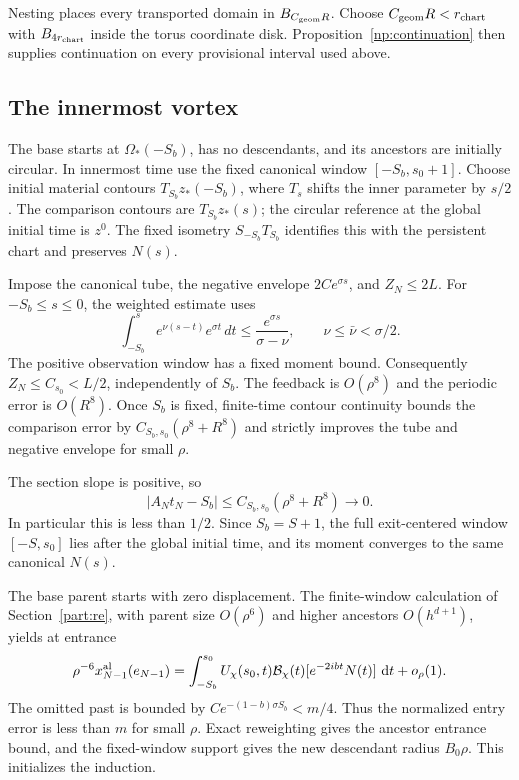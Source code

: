 \documentclass[11pt]{amsart}
\theoremstyle{remark}
\numberwithin{equation}{section}
\newcommand{\dd}{\,\mathrm d}
\begin{document}
Nesting places every transported domain in $B_{C_{\rm geom}R}$.
Choose $C_{\rm geom}R<r_{\rm chart}$ with $B_{4r_{\rm chart}}$
inside the torus coordinate disk. Proposition~\ref{np:continuation}
then supplies continuation on every provisional interval used above.


\subsection{The innermost vortex}
The base starts at $\Omega_*(-S_b)$, has no descendants, and its
ancestors are initially circular. In innermost time use the fixed
canonical window $[-S_b,s_0+1]$. Choose initial material contours
$T_{S_b}z_*(-S_b)$, where $T_s$ shifts the inner parameter by $s/2$.
The comparison contours are $T_{S_b}z_*(s)$; the circular reference
at the global initial time is $z^0$. The fixed isometry
$S_{-S_b}T_{S_b}$ identifies this with the persistent chart and
preserves $N(s)$.

Impose the canonical tube, the negative envelope $2Ce^{\sigma s}$,
and $Z_N\le2L$. For $-S_b\le s\le0$, the weighted estimate uses
\[
 \int_{-S_b}^s e^{\nu(s-t)}e^{\sigma t}\,dt
       \le\frac{e^{\sigma s}}{\sigma-\nu},\qquad
 \nu\le\bar\nu<\sigma/2.
\]
The positive observation window has a fixed moment bound.
Consequently $Z_N\le C_{s_0}<L/2$, independently of $S_b$.
The feedback is $O(\rho^8)$ and the periodic error is $O(R^8)$.
Once $S_b$ is fixed, finite-time contour continuity bounds the
comparison error by $C_{S_b,s_0}(\rho^8+R^8)$ and strictly improves
the tube and negative envelope for small $\rho$.

The section slope is positive, so
\[
 |A_Nt_N-S_b|\le C_{S_b,s_0}(\rho^8+R^8)\longrightarrow0.
\]
In particular this is less than $1/2$. Since $S_b=S+1$, the full
exit-centered window $[-S,s_0]$ lies after the global initial time,
and its moment converges to the same canonical $N(s)$.

The base parent starts with zero displacement. The finite-window
calculation of Section~\ref{part:re}, with parent size $O(\rho^6)$
and higher ancestors $O(h^{d+1})$, yields at entrance
\[
 \rho^{-6}x_{N-1}^{\rm al}(e_{N-1})
 =\int_{-S_b}^{s_0}U_\chi(s_0,t)\mathcal B_\chi(t)
       [e^{-2ibt}N(t)]\,\dd t+o_\rho(1).
\]
The omitted past is bounded by
$Ce^{-(1-b)\sigma S_b}<m/4$. Thus the normalized entry error is
less than $m$ for small $\rho$. Exact reweighting gives the
ancestor entrance bound, and the fixed-window support gives
the new descendant radius $B_0\rho$. This initializes the induction.
\end{document}
